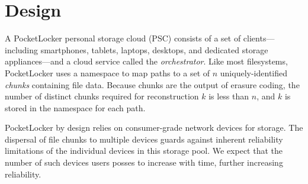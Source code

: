 
\section{Design}
\label{sec-design}

A PocketLocker personal storage cloud (PSC) consists of a set of
clients---including smartphones, tablets, laptops, desktops, and dedicated
storage appliances---and a cloud service called the \textit{orchestrator}.
Like most filesystems, PocketLocker uses a namespace to map paths to a set of
$n$ uniquely-identified \textit{chunks} containing file data. Because chunks
are the output of erasure coding, the number of distinct chunks required for
reconstruction $k$ is less than $n$, and $k$ is stored in the namespace for
each path.

PocketLocker by design relies on consumer-grade network devices for storage.
The dispersal of file chunks to multiple devices guards against inherent
reliability limitations of the individual devices in this storage pool. We
expect that the number of such devices users posses to increase with time,
further increasing reliability.


